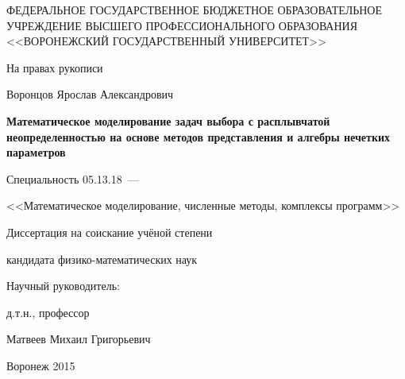 \thispagestyle{empty}

\begin{center}
ФЕДЕРАЛЬНОЕ ГОСУДАРСТВЕННОЕ БЮДЖЕТНОЕ ОБРАЗОВАТЕЛЬНОЕ
УЧРЕЖДЕНИЕ ВЫСШЕГО ПРОФЕССИОНАЛЬНОГО ОБРАЗОВАНИЯ
<<ВОРОНЕЖСКИЙ ГОСУДАРСТВЕННЫЙ УНИВЕРСИТЕТ>>
\par
\par 
\par
\end{center}

\vspace{10mm}
\begin{flushright}
На правах рукописи \\
\end{flushright}

\vspace{10mm}
\begin{center}
{\large Воронцов Ярослав Александрович}
\end{center}

\vspace{5mm}
\begin{center}
{\bf \large Математическое моделирование задач выбора с расплывчатой неопределенностью на основе методов представления и алгебры нечетких параметров
\par}

\vspace{10mm}
{%
Специальность 05.13.18~---

<<Математическое моделирование, численные методы, комплексы программ>>
}

\vspace{10mm}
Диссертация на соискание учёной степени

кандидата физико-математических наук
\end{center}

\vspace{10mm}
\begin{flushright}
Научный руководитель:

д.т.н., профессор

Матвеев Михаил Григорьевич

\end{flushright}

\vspace{15mm}
\begin{center}
{Воронеж 2015}
\end{center}

\newpage